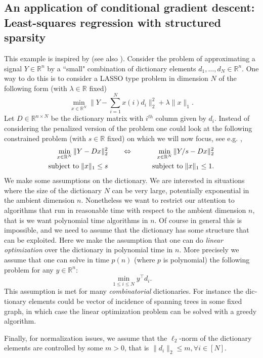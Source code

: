 \documentclass[openany]{now}
\newcommand{\R}{\mathbb{R}}
\begin{document}
\subsection*{An application of conditional gradient descent: Least-squares regression with structured sparsity}
This example is inspired by \cite{Lug10} (see also \cite{Jon92}). Consider the problem of approximating a signal $Y \in \mathbb{R}^n$ by a ``small" combination of dictionary elements $d_1, \hdots, d_N \in \mathbb{R}^n$. One way to do this is to consider a LASSO type problem in dimension $N$ of the following form (with $\lambda \in \R$ fixed)
$$\min_{x \in \mathbb{R}^N} \big\| Y - \sum_{i=1}^N x(i) d_i \big\|_2^2 + \lambda \|x\|_1 .$$
Let $D \in \mathbb{R}^{n \times N}$ be the dictionary matrix with $i^{th}$ column given by $d_i$. Instead of considering the penalized version of the problem one could look at the following constrained problem (with $s \in \R$ fixed) on which we will now focus, see e.g. \cite{FT07},
\begin{eqnarray}
\min_{x \in \mathbb{R}^N} \| Y - D x \|_2^2 
& \qquad \Leftrightarrow \qquad & \min_{x \in \mathbb{R}^N} \| Y / s - D x \|_2^2 \label{eq:structuredsparsity} \\
\text{subject to}  \; \|x\|_1 \leq s
& & \text{subject to} \; \|x\|_1 \leq 1 . \notag
\end{eqnarray}
We make some assumptions on the dictionary. We are interested in situations where the size of the dictionary $N$ can be very large, potentially exponential in the ambient dimension $n$. Nonetheless we want to restrict our attention to algorithms that run in reasonable time with respect to the ambient dimension $n$, that is we want polynomial time algorithms in $n$. Of course in general this is impossible, and we need to assume that the dictionary has some structure that can be exploited. Here we make the assumption that one can do {\em linear optimization} over the dictionary in polynomial time in $n$. More precisely we assume that one can solve in time $p(n)$ (where $p$ is polynomial) the following problem for any $y \in \mathbb{R}^n$:
$$\min_{1 \leq i \leq N} y^{\top} d_i .$$
This assumption is met for many {\em combinatorial} dictionaries. For instance the dic­tio­nary ele­ments could be vec­tor of inci­dence of span­ning trees in some fixed graph, in which case the lin­ear opti­miza­tion prob­lem can be solved with a greedy algorithm.

Finally, for normalization issues, we assume that the $\ell_2$-norm of the dictionary elements are controlled by some $m>0$, that is $\|d_i\|_2 \leq m, \forall i \in [N]$.
\end{document}
